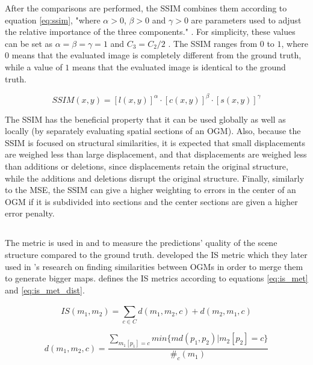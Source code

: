 After the comparisons are performed, the \gls{SSIM} combines them according to equation \ref{eq:ssim}, "where $\alpha > 0$, $\beta > 0$ and $\gamma > 0$ are parameters used to adjust the relative importance of the three components." \cite{wang2004image}. For simplicity, these values can be set as $\alpha = \beta = \gamma = 1$ and $C_3 = C_2/2$ \cite{wang2004image}. The \gls{SSIM} ranges from $0$ to $1$, where $0$ means that the evaluated image is completely different from the ground truth, while a value of $1$ means that the evaluated image is identical to the ground truth.

\begin{equation} \label{eq:ssim}
	SSIM(x,y) = [l(x,y)]^\alpha \cdot [c(x,y)]^\beta \cdot [s(x,y)]^\gamma
\end{equation}

The \gls{SSIM} has the beneficial property that it can be used globally as well as locally (by separately evaluating spatial sections of an \gls{OGM}). Also, because the \gls{SSIM} is focused on structural similarities, it is expected that small displacements are weighed less than large displacement, and that displacements are weighed less than additions or deletions, since displacements retain the original structure, while the additions and deletions disrupt the original structure. Finally, similarly to the \gls{MSE}, the \gls{SSIM} can give a higher weighting to errors in the center of an \gls{OGM} if it is subdivided into sections and the center sections are given a higher error penalty.


\subsection{} \label{subsec:is_met}
The  metric is used in \cite{lange2020attention} and \cite{toyungyernsub2020double} to measure the predictions' quality of the scene structure compared to the ground truth. \cite{birk1996learning} developed the \gls{IS} metric which they later used in \cite{birk2006merging}'s research on finding similarities between \glspl{OGM} in order to merge them to generate bigger maps. \cite{birk1996learning} defines the \gls{IS} metrics according to  equations \ref{eq:is_met} and \ref{eq:is_met_dist}.


\begin{equation} \label{eq:is_met}
	IS(m_1, m_2) = \sum_{c \in C}^{}d(m_1, m_2,c) + d(m_2,m_1,c)
\end{equation}

\begin{equation} \label{eq:is_met_dist}
	d(m_1, m_2,c) = \frac{\sum_{m_1[p_1]=c}^{} min\{md(p_1, p_2)|m_2[p_2]=c\}}{\#_c(m_1)}
\end{equation}

